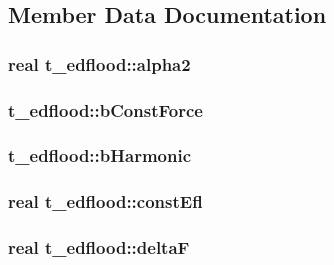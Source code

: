 \subsection{\-Member \-Data \-Documentation}
\hypertarget{structt__edflood_aedb9b030bb630711eef8090289e412c9}{
\subsubsection[{alpha2}]{\setlength{\rightskip}{0pt plus 5cm}real {\bf t\-\_\-edflood\-::alpha2}}}\label{structt__edflood_aedb9b030bb630711eef8090289e412c9}
\hypertarget{structt__edflood_a7a27e1cdd5ce0e71e80b4e407da59048}{
\subsubsection[{b\-Const\-Force}]{ {\bf t\-\_\-edflood\-::b\-Const\-Force}}}\label{structt__edflood_a7a27e1cdd5ce0e71e80b4e407da59048}
\hypertarget{structt__edflood_af7e718b7dc9ad60dd074da61a4aa26ca}{
\subsubsection[{b\-Harmonic}]{ {\bf t\-\_\-edflood\-::b\-Harmonic}}}\label{structt__edflood_af7e718b7dc9ad60dd074da61a4aa26ca}
\hypertarget{structt__edflood_aea1b3a81f370cfd8c32ee2d77d43372c}{
\subsubsection[{const\-Efl}]{\setlength{\rightskip}{0pt plus 5cm}real {\bf t\-\_\-edflood\-::const\-Efl}}}\label{structt__edflood_aea1b3a81f370cfd8c32ee2d77d43372c}
\hypertarget{structt__edflood_ab27ce309e68a0f845f694051496d1749}{
\subsubsection[{delta\-F}]{\setlength{\rightskip}{0pt plus 5cm}real {\bf t\-\_\-edflood\-::delta\-F}}}\label{structt__edflood_ab27ce309e68a0f845f694051496d1749}
